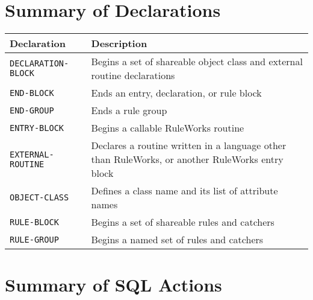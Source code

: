 \section{Summary of Declarations}

\begin{longtable}{p{4cm}p{11cm}}
  \toprule
  Declaration & Description \\
  \midrule
  \tt{DECLARATION-BLOCK} & Begins a set of shareable object class  
                           and external routine declarations \\\addlinespace
  \tt{END-BLOCK} & Ends an entry, declaration, or rule block \\\addlinespace
  \tt{END-GROUP} & Ends a rule group \\\addlinespace
  \tt{ENTRY-BLOCK} & Begins a callable RuleWorks routine \\\addlinespace
  \tt{EXTERNAL-ROUTINE} & Declares a routine written in a language 
                          other than RuleWorks, or another 
                          RuleWorks entry block \\\addlinespace
  \tt{OBJECT-CLASS} & Defines a class name and its list of 
                      attribute names \\\addlinespace
  \tt{RULE-BLOCK} &  Begins a set of shareable rules and 
                    catchers \\\addlinespace
  \tt{RULE-GROUP} & Begins a named set of rules and catchers \\
  \bottomrule
\end{longtable}


\section{Summary of SQL Actions}

